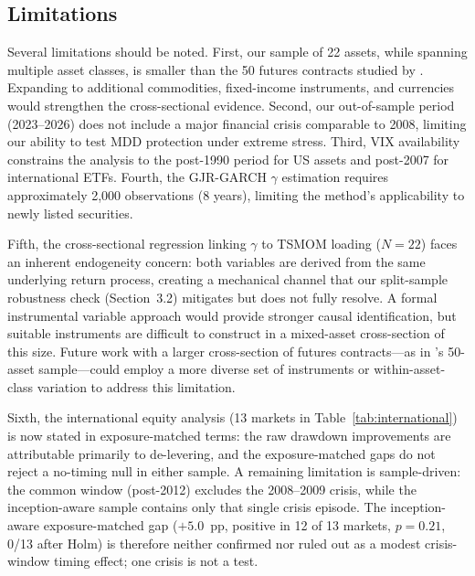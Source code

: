 \subsection{Limitations}

Several limitations should be noted. First, our sample of 22 assets, while spanning multiple asset classes, is smaller than the 50 futures contracts studied by \citet{hood2025}. Expanding to additional commodities, fixed-income instruments, and currencies would strengthen the cross-sectional evidence. Second, our out-of-sample period (2023--2026) does not include a major financial crisis comparable to 2008, limiting our ability to test MDD protection under extreme stress. Third, VIX availability constrains the analysis to the post-1990 period for US assets and post-2007 for international ETFs. Fourth, the GJR-GARCH $\gamma$ estimation requires approximately 2,000 observations (8 years), limiting the method's applicability to newly listed securities.

Fifth, the cross-sectional regression linking $\gamma$ to TSMOM loading ($N = 22$) faces an inherent endogeneity concern: both variables are derived from the same underlying return process, creating a mechanical channel that our split-sample robustness check (Section~3.2) mitigates but does not fully resolve. A formal instrumental variable approach would provide stronger causal identification, but suitable instruments are difficult to construct in a mixed-asset cross-section of this size. Future work with a larger cross-section of futures contracts---as in \citet{hood2025}'s 50-asset sample---could employ a more diverse set of instruments or within-asset-class variation to address this limitation.

Sixth, the international equity analysis (13 markets in Table~\ref{tab:international}) is now stated in exposure-matched terms: the raw drawdown improvements are attributable primarily to de-levering, and the exposure-matched gaps do not reject a no-timing null in either sample. A remaining limitation is sample-driven: the common window (post-2012) excludes the 2008--2009 crisis, while the inception-aware sample contains only that single crisis episode. The inception-aware exposure-matched gap ($+5.0$~pp, positive in 12 of 13 markets, $p = 0.21$, 0/13 after Holm) is therefore neither confirmed nor ruled out as a modest crisis-window timing effect; one crisis is not a test.


